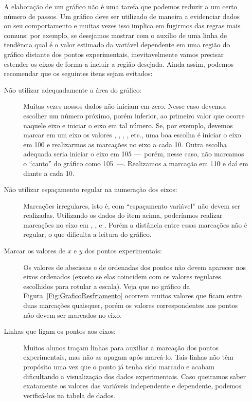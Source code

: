 A elaboração de um gráfico não é uma tarefa que podemos reduzir a um certo número de passos. Um gráfico deve ser utilizado de maneira a evidenciar dados ou seu comportamento e muitas vezes isso implica em fugirmos das regras mais comuns: por exemplo, se desejamos mostrar com o auxílio de uma linha de tendência qual é o valor estimado da variável dependente em uma região do gráfico distante dos pontos experimentais, inevitavelmente vamos precisar estender os eixos de forma a incluir a região desejada. Ainda assim, podemos recomendar que os seguintes itens sejam evitados:
\begin{description}
	\item[Não utilizar adequadamente a área do gráfico:] Muitas vezes nossos dados não iniciam em zero. Nesse caso devemos escolher um número próximo, porém inferior, ao primeiro valor que ocorre naquele eixo e iniciar o eixo em tal número. Se, por exemplo, devemos marcar em um eixo os valores , , , , etc., uma boa escolha é iniciar o eixo em 100 e realizarmos as marcações no eixo a cada 10. Outra escolha adequada seria iniciar o eixo em 105 ---~porém, nesse caso, não marcamos o ``canto'' do gráfico como 105~---. Realizamos a marcação em 110 e daí em diante a cada 10.
	\item[Não utilizar espaçamento regular na numeração dos eixos:] Marcações irregulares, isto é, com ``espaçamento variável'' não devem ser realizadas. Utilizando os dados do item acima, poderíamos realizar marcações no eixo em , ,  e . Porém a distância entre essas marcações não é regular, o que dificulta a leitura do gráfico.
	\item[Marcar os valores de $x$ e $y$ dos pontos experimentais:] Os valores de abscissas e de ordenadas dos pontos não devem aparecer nos eixos ordenados (exceto se elas coincidem com os valores regulares escolhidos para rotular a escala). Veja que no gráfico da Figura~\ref{Fig:GraficoResfriamento} ocorrem muitos valores que ficam entre duas marcações quaisquer, porém os valores correspondentes aos pontos não devem ser marcados no eixo.
	\item[Linhas que ligam os pontos aos eixos:] Muitos alunos traçam linhas para auxiliar a marcação dos pontos experimentais, mas não as apagam após marcá-lo. Tais linhas não têm propósito uma vez que o ponto já tenha sido marcado e acabam dificultando a visualização dos dados experimentais. Caso queiramos saber exatamente os valores das variáveis independente e dependente, podemos verificá-los na tabela de dados.

\end{description}
